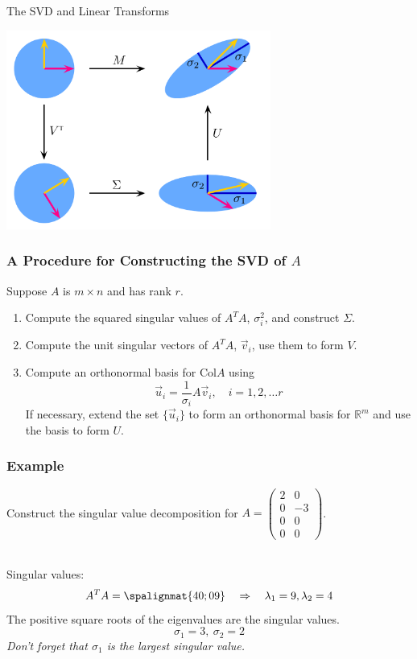 \begin{frame}{The SVD and Linear Transforms}
    \begin{center}
    \includegraphics[width=0.65\textwidth]{Chapter7/images/image006.png} 
    \end{center}
\end{frame}




\begin{frame}\frametitle{A Procedure for Constructing the SVD of $A$}
    Suppose $A$ is $m \times n$ and has rank $r$. 
    
    \begin{enumerate}
        \item<2-> Compute the squared singular values of $A^TA$, $\sigma_i^2$, and construct $\Sigma$. \vspace{6pt}
        \item<3-> Compute the unit singular vectors of $A^TA$, $\vec v_i$, use them to form $V$. \vspace{6pt}
        \item<4-> Compute an orthonormal basis for Col$A$ using $$\vec u_i = \frac{1}{\sigma_i}A\vec v_i, \quad i = 1, 2, \ldots r$$ If necessary, extend the set $\{\vec u_i\}$ to form an orthonormal basis for $\mathbb R^m$ and use the basis to form $U$. 
    \end{enumerate}
\end{frame}




\begin{frame}\frametitle{Example}
    Construct the singular value decomposition for $A = 
    \begin{pmatrix}
    2 & 0 \\ 0 & -3 \\ 0 & 0 \\ 0 & 0 
    \end{pmatrix}
    $.
    
    \vspace{12pt}
    \pause 
    \\ \pause 
    Singular values: 
    $$A^TA = \spalignmat{4 0;0 9} \quad \Rightarrow \quad \lambda_1 = 9, \lambda_2=4$$ \pause 
    The positive square roots of the eigenvalues are the singular values. 
    $$\sigma_1 = 3, \ \sigma_2 = 2$$
    \textit{Don't forget that $\sigma_1$ is the largest singular value.}
    
\end{frame}





